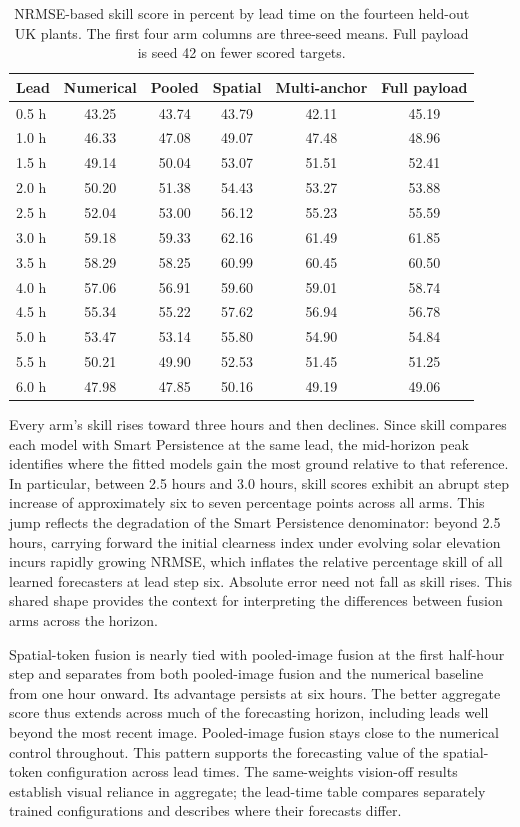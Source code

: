 \begin{table}[htbp]
\centering
\begin{tabular}{lccccc}
\hline
Lead & Numerical & Pooled & Spatial & Multi-anchor & Full payload \\
\hline
0.5 h & 43.25 & 43.74 & 43.79 & 42.11 & 45.19 \\
1.0 h & 46.33 & 47.08 & 49.07 & 47.48 & 48.96 \\
1.5 h & 49.14 & 50.04 & 53.07 & 51.51 & 52.41 \\
2.0 h & 50.20 & 51.38 & 54.43 & 53.27 & 53.88 \\
2.5 h & 52.04 & 53.00 & 56.12 & 55.23 & 55.59 \\
3.0 h & 59.18 & 59.33 & 62.16 & 61.49 & 61.85 \\
3.5 h & 58.29 & 58.25 & 60.99 & 60.45 & 60.50 \\
4.0 h & 57.06 & 56.91 & 59.60 & 59.01 & 58.74 \\
4.5 h & 55.34 & 55.22 & 57.62 & 56.94 & 56.78 \\
5.0 h & 53.47 & 53.14 & 55.80 & 54.90 & 54.84 \\
5.5 h & 50.21 & 49.90 & 52.53 & 51.45 & 51.25 \\
6.0 h & 47.98 & 47.85 & 50.16 & 49.19 & 49.06 \\
\hline
\end{tabular}
\caption{NRMSE-based skill score in percent by lead time on the fourteen held-out UK plants. The first four arm columns are three-seed means. Full payload is seed 42 on fewer scored targets.}
\label{tab:horizon-skill}
\end{table}

Every arm's skill rises toward three hours and then declines. Since skill compares each model with Smart Persistence at the same lead, the mid-horizon peak identifies where the fitted models gain the most ground relative to that reference. In particular, between 2.5 hours and 3.0 hours, skill scores exhibit an abrupt step increase of approximately six to seven percentage points across all arms. This jump reflects the degradation of the Smart Persistence denominator: beyond 2.5 hours, carrying forward the initial clearness index under evolving solar elevation incurs rapidly growing NRMSE, which inflates the relative percentage skill of all learned forecasters at lead step six. Absolute error need not fall as skill rises. This shared shape provides the context for interpreting the differences between fusion arms across the horizon.

Spatial-token fusion is nearly tied with pooled-image fusion at the first half-hour step and separates from both pooled-image fusion and the numerical baseline from one hour onward. Its advantage persists at six hours. The better aggregate score thus extends across much of the forecasting horizon, including leads well beyond the most recent image. Pooled-image fusion stays close to the numerical control throughout. This pattern supports the forecasting value of the spatial-token configuration across lead times. The same-weights vision-off results establish visual reliance in aggregate; the lead-time table compares separately trained configurations and describes where their forecasts differ.

